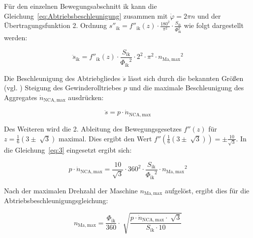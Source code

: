 Für den einzelnen Bewegungsabschnitt $\mathrm{ik}$ kann die Gleichung~\ref{eq:Abtriebsbeschleunigung} zusammen mit $\dot{\varphi}  = 2 \pi  n $ und der Übertragungsfunktion 2. Ordnung $s''_{\mathrm{ik}} = f''_{\mathrm{ik}}(z) \cdot \frac{180^2}{\pi^2} \cdot \frac{S_{\mathrm{ik}}}{\Phi_{\mathrm{ik}}^2}$ wie folgt dargestellt werden:



\begin{equation}\label{eq:3}
\ddot{s}_{\mathrm{ik}} = f''_{\mathrm{ik}}(z) \cdot \frac{S_{\mathrm{ik}}}   {{\Phi_{\mathrm{ik}}}^2} \cdot 2^2 \cdot \pi^2 \cdot {n_{\mathrm{Ma, max}}}^2
\end{equation}



Die Beschleunigung des Abtriebgliedes $\ddot{s}$ lässt sich durch die bekannten Größen (vgl. \cite{Riedle2015}) Steigung des Gewinderolltriebes $p$ und die maximale Beschleunigung des Aggregates $\dot{n}_{\mathrm{NCA, max}}$ ausdrücken:

\begin{equation}
\ddot{s} =p \cdot \dot{n}_{\mathrm{NCA, max}}
\end{equation}


Des Weiteren wird die 2. Ableitung des Bewegungsgesetzes $f''(z)$ für $z = \frac{1}{6}(3 \pm \sqrt[]{3})$ maximal. Dies ergibt den Wert $f''(\frac{1}{6}(3 \pm \sqrt[]{3}))= \pm \frac{10}{\sqrt{3}}$. In die Gleichung~\ref{eq:3} eingesetzt ergibt sich:

\begin{equation}
p \cdot \dot{n}_{\mathrm{NCA, max}} = \frac{10}{\sqrt{3}} \cdot 360^2  \cdot \frac{S_{\mathrm{ik}}}   {{\Phi_{\mathrm{ik}}}^2} \cdot {n_{\mathrm{Ma, max}}}^2
\end{equation}






Nach der maximalen Drehzahl der Maschine $n_{\mathrm{Ma, max}}$ aufgelöst, ergibt dies für die Abtriebsbeschleunigungsgleichung:

\begin{equation}\label{eq:4}
n_{\mathrm{Ma, max}} = \frac{\Phi_{\mathrm{ik}}}{360} \cdot \sqrt[]{\frac{p \cdot \dot{n}_{\mathrm{NCA, max}} \cdot \sqrt[]{3}}  {S_{\mathrm{ik}} \cdot 10}}
\end{equation}



